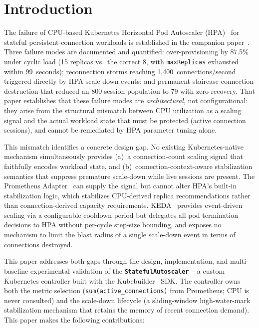 \documentclass[twocolumn]{svjour3}
\begin{document}
\begin{abstract}
\end{abstract}



\section{Introduction}
\label{sec:intro}

The failure of CPU-based Kubernetes Horizontal Pod Autoscaler (HPA)~\cite{k8s_hpa_docs} for stateful
persistent-connection workloads is established in the companion paper~\cite{behera2026hpa}.
Three failure modes are documented and quantified: over-provisioning by 87.5\% under cyclic
load (15 replicas vs.\ the correct 8, with \texttt{maxReplicas} exhausted within 99~seconds);
reconnection storms reaching 1,400~connections/second triggered directly by HPA scale-down
events; and permanent staircase connection destruction that reduced an 800-session population
to 79 with zero recovery. That paper establishes that these failure modes are
\textit{architectural}, not configurational: they arise from the structural mismatch between CPU
utilization as a scaling signal and the actual workload state that must be protected (active
connection sessions), and cannot be remediated by HPA parameter tuning alone.

This mismatch identifies a concrete design gap. No existing Kubernetes-native mechanism
simultaneously provides (a)~a connection-count scaling signal that faithfully encodes workload
state, and (b)~connection-context-aware stabilization semantics that suppress premature
scale-down while live sessions are present. The Prometheus Adapter~\cite{prometheus_adapter}
can supply the signal but cannot alter HPA's built-in stabilization logic, which stabilizes
CPU-derived replica recommendations rather than connection-derived capacity requirements.
KEDA~\cite{keda_docs} provides event-driven scaling via a configurable cooldown period but
delegates all pod termination decisions to HPA without per-cycle step-size bounding, and
exposes no mechanism to limit the blast radius of a single scale-down event in terms of
connections destroyed.

This paper addresses both gaps through the design, implementation, and multi-baseline
experimental validation of the \textbf{\texttt{StatefulAutoscaler}} -- a custom Kubernetes
controller built with the Kubebuilder~\cite{kubebuilder_docs} SDK. The controller owns both
the metric selection (\texttt{sum(active\_connections)} from Prometheus; CPU is never
consulted) and the scale-down lifecycle (a sliding-window high-water-mark stabilization
mechanism that retains the memory of recent connection demand). This paper makes the
following contributions:
\end{document}
